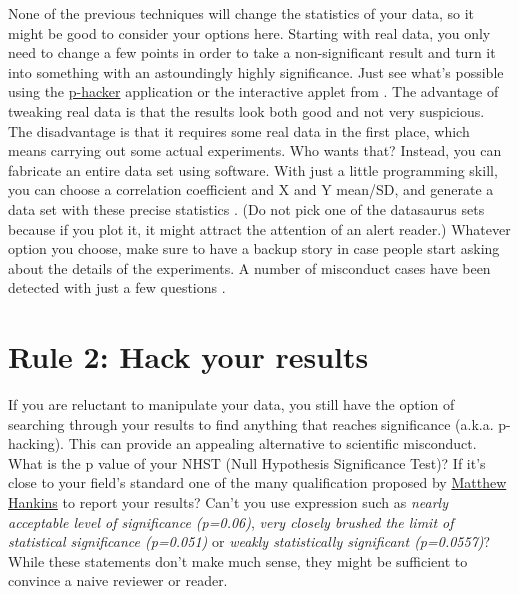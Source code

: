 \documentclass[11pt,letter]{article}
\providecommand\citep{\cite}
\begin{document}
None of the previous techniques will change the statistics of your
data, so it might be good to consider your options here. Starting with real
data, you only need to change a few points in order to take a non-significant
result and turn it into something with an astoundingly highly significance. Just see what's possible using the
\href{http://shinyapps.org/apps/p-hacker/}{p-hacker} application
\citep{schonbrodt:2015} or the interactive applet from
\citep{aschwanden:2015}. The advantage of tweaking real data is that the results  look both good and not very
suspicious. The disadvantage is that it requires some real data in the first
place, which means carrying out some actual experiments. Who wants that? Instead, you can fabricate an entire data set using software. With just a little programming skill, you can choose a correlation coefficient and X and Y mean/SD, and generate a data set with these precise
statistics \citep{matejka:2017}. (Do not pick one of the datasaurus sets because if you
plot it, it might attract the attention of an alert reader.) Whatever option you choose, make sure to
have a backup story in case people start asking about the details of the experiments. A
number of misconduct cases have been detected with just a few questions
\citep{vastag:2006}.



\section*{Rule 2: Hack your results}

If you are reluctant to manipulate your data, you still have the option of
searching through your results to find anything that reaches significance 
(a.k.a. p-hacking). This can provide an appealing alternative to scientific misconduct. What is the p value of your NHST (Null Hypothesis
Significance Test)? If it's close to your field's standard one of the many qualification
proposed by
\href{https://mchankins.wordpress.com/2013/04/21/still-not-significant-2/}{Matthew
  Hankins} to report your results? Can't you use expression such as {\em nearly
  acceptable level of significance (p=0.06)}, {\em very closely brushed the
  limit of statistical significance (p=0.051)} or {\em weakly statistically
  significant (p=0.0557)}? While these statements don't make much sense, they might
be sufficient to convince a naive reviewer or reader. 
\end{document}
